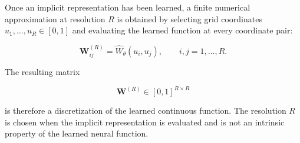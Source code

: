 Once an implicit representation has been learned, a finite numerical approximation at resolution \(R\) is obtained by selecting grid coordinates \(u_1,\ldots,u_R\in[0,1]\) and evaluating the learned function at every coordinate pair:

\[
\mathbf{W}^{(R)}_{ij}
=
\widehat{W}_{\theta}(u_i,u_j),
\qquad i,j=1,\ldots,R.
\]

The resulting matrix

\[
\mathbf{W}^{(R)}\in[0,1]^{R\times R}
\]

is therefore a discretization of the learned continuous function. The resolution \(R\) is chosen when the implicit representation is evaluated and is not an intrinsic property of the learned neural function.
